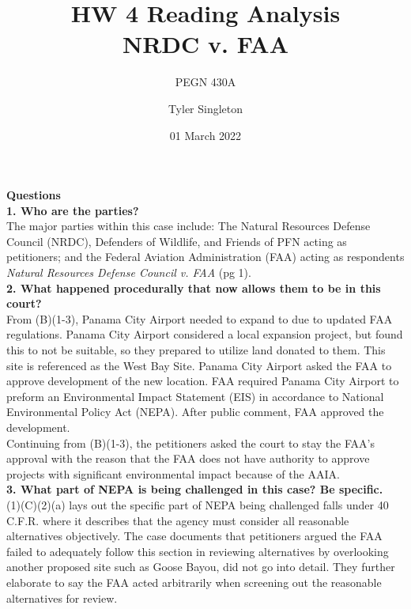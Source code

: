 \documentclass[12pt]{article}
\title{HW 4 Reading Analysis\\
NRDC v. FAA}
\subtitle{PEGN 430A}
\author{Tyler Singleton}
\date{01 March 2022}
\begin{document}
\maketitle

\newpage
\setlength{\parindent}{0pt}

\textbf{Questions} \\

\textbf{1. Who are the parties?} \\

The major parties within this case include: The Natural Resources Defense Council (NRDC), Defenders of Wildlife, and Friends of PFN acting as petitioners; and the Federal Aviation Administration (FAA) acting as respondents \textit{Natural Resources Defense Council v. FAA} (pg 1). 
\\

\textbf{2. What happened procedurally that now allows them to be in this court?} \\

From (B)(1-3), Panama City Airport needed to expand to due to updated FAA regulations. Panama City Airport considered a local expansion project, but found this to not be suitable, so they prepared to utilize land donated to them. This site is referenced as the West Bay Site. Panama City Airport asked the FAA to approve development of the new location. FAA required Panama City Airport to preform an Environmental Impact Statement (EIS) in accordance to National Environmental Policy Act (NEPA). After public comment, FAA approved the development. \\

Continuing from (B)(1-3), the petitioners asked the court to stay the FAA's approval with the reason that the FAA does not have authority to approve projects with significant environmental impact because of the AAIA. \\

\textbf{3. What part of NEPA is being challenged in this case?  Be specific.} \\

\textsection (1)(C)(2)(a) lays out the specific part of NEPA being challenged falls under 40 C.F.R.  where it describes that the agency must consider all reasonable alternatives objectively. The case documents that petitioners argued the FAA failed to adequately follow this section in reviewing alternatives by overlooking another proposed site such as Goose Bayou, did not go into detail. They further elaborate to say the FAA acted arbitrarily when screening out the reasonable alternatives for review. \\
\end{document}
